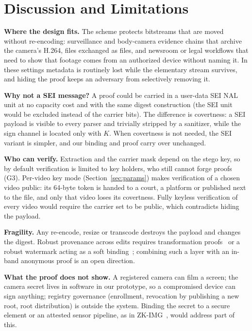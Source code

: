 \section{Discussion and Limitations}
\label{sec:discussion}

\textbf{Where the design fits.} The scheme protects bitstreams that are moved without re-encoding: surveillance and body-camera evidence chains that archive the camera's H.264, files exchanged as files, and newsroom or legal workflows that need to show that footage comes from an authorized device without naming it. In these settings metadata is routinely lost while the elementary stream survives, and hiding the proof keeps an adversary from selectively removing it.

\textbf{Why not a SEI message?} A proof could be carried in a user-data SEI NAL unit at no capacity cost and with the same digest construction (the SEI unit would be excluded instead of the carrier bits). The difference is covertness: a SEI payload is visible to every parser and trivially stripped by a sanitizer, while the sign channel is located only with $K$. When covertness is not needed, the SEI variant is simpler, and our binding and proof carry over unchanged.

\textbf{Who can verify.} Extraction and the carrier mask depend on the stego key, so by default verification is limited to key holders, who still cannot forge proofs (G3). Per-video key mode (Section~\ref{sec:params}) makes verification of a chosen video public: its 64-byte token is handed to a court, a platform or published next to the file, and only that video loses its covertness. Fully keyless verification of every video would require the carrier set to be public, which contradicts hiding the payload.

\textbf{Fragility.} Any re-encode, resize or transcode destroys the payload and changes the digest. Robust provenance across edits requires transformation proofs~\cite{photoproof2016,veritas2024,zkcinema2026} or a robust watermark acting as a soft binding~\cite{c2pa_spec}; combining such a layer with an in-band anonymous proof is an open direction.

\textbf{What the proof does not show.} A registered camera can film a screen; the camera secret lives in software in our prototype, so a compromised device can sign anything; registry governance (enrollment, revocation by publishing a new root, root distribution) is outside the system. Binding the secret to a secure element or an attested sensor pipeline, as in ZK-IMG~\cite{zkimg2022}, would address part of this.

